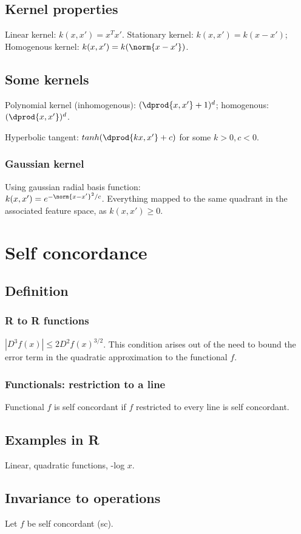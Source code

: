 \documentclass[oneside, article]{memoir}
\begin{document}
\subsection{Kernel properties}
Linear kernel: $k(x, x') = x^{T}x'$. Stationary kernel: $k(x, x') = k(x-x')$; Homogenous kernel: $k(x, x') = k(\norm{x - x'})$.

\subsection{Some kernels}
Polynomial kernel (inhomogenous): $(\dprod{x, x'}+1)^{d}$; homogenous: $(\dprod{x, x'})^{d}$.

Hyperbolic tangent: $tanh(\dprod{kx,x'}+c)$ for some $k>0, c<0$.

\subsubsection{Gaussian kernel}
Using gaussian radial basis function:\\
 $k(x,x') = e^{-\norm{x - x'}^{2}/c}$. Everything mapped to the same quadrant in the associated feature space, as $k(x, x') \geq 0$.

\section{Self concordance}
\subsection{Definition}
\subsubsection{R to R functions}
$|D^{3}f(x)| \leq 2 D^{2}f(x)^{3/2}$. This condition arises out of the need to bound the error term in the quadratic approximation to the functional $f$.

\subsubsection{Functionals: restriction to a line}
Functional $f$ is self concordant if $f$ restricted to every line is self concordant.

\subsection{Examples in R}
Linear, quadratic functions, -log $x$.

\subsection{Invariance to operations}
Let $f$ be self concordant (sc).
\end{document}
